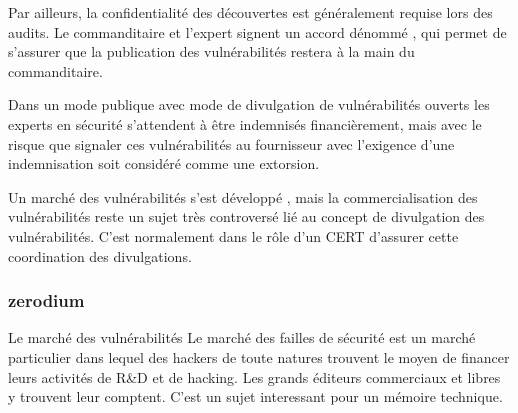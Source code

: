 Par ailleurs, la confidentialité des découvertes est généralement requise lors des audits. Le commanditaire et l'expert signent un accord dénommé , qui permet de s'assurer que la publication des vulnérabilités restera à la main du commanditaire.

Dans un mode publique avec mode de divulgation de vulnérabilités ouverts les experts en sécurité  s'attendent à être indemnisés financièrement, mais avec le risque que signaler ces vulnérabilités au fournisseur avec l'exigence d'une indemnisation soit considéré comme une extorsion. 

Un marché des vulnérabilités s'est développé , mais la commercialisation des vulnérabilités reste un sujet très controversé lié au concept de divulgation des vulnérabilités.   C'est normalement dans le rôle d'un CERT d'assurer cette coordination des divulgations.


\begin{frame}
\frametitle<presentation>{zerodium}
\end{frame}


\begin{warningbox}{Le marché des vulnérabilités}
Le marché des failles de sécurité est un marché particulier dans lequel des hackers de toute natures trouvent le moyen de financer leurs activités de R\&D et de hacking. Les grands éditeurs commerciaux et libres y trouvent leur comptent. C'est un sujet interessant pour un mémoire technique. 	
\end{warningbox}





